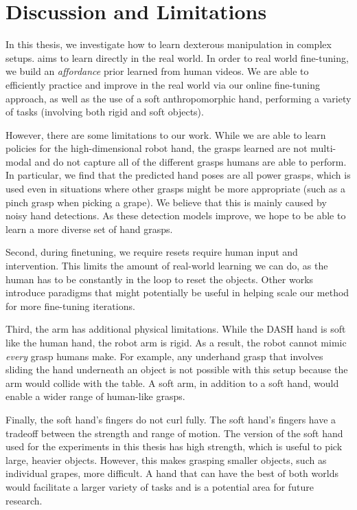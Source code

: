 \chapter{Discussion and Limitations}
\label{sec:discussion}

In this thesis, we investigate how to learn dexterous manipulation in complex setups. \ours aims to learn directly in the real world. In order to real world fine-tuning, we build an \textit{affordance} prior learned from human videos. We are able to efficiently practice and improve in the real world via our online fine-tuning approach, as well as the use of a soft anthropomorphic hand, performing a variety of tasks (involving both rigid and soft objects).

However, there are some limitations to our work.  While we are able to learn policies for the high-dimensional robot hand, the grasps learned are not multi-modal and do not capture all of the different grasps humans are able to perform.  In particular, we find that the predicted hand poses are all power grasps, which is used even in situations where other grasps might be more appropriate (such as a pinch grasp when picking a grape). We believe that this is mainly caused by noisy hand detections. As these detection models improve, we hope to be able to learn a more diverse set of hand grasps. 

Second, during finetuning, we require resets require human input and intervention. This limits the amount of real-world learning we can do, as the human has to be constantly in the loop to reset the objects. Other works \cite{chen2022single, guptaYuZhaoKumar2021reset} introduce paradigms that might potentially be useful in helping scale our method for more fine-tuning iterations.

Third, the arm has additional physical limitations. While the DASH hand is soft like the human hand, the robot arm is rigid. As a result, the robot cannot mimic \textit{every} grasp humans make. For example, any underhand grasp that involves sliding the hand underneath an object is not possible with this setup because the arm would collide with the table. A soft arm, in addition to a soft hand, would enable a wider range of human-like grasps.

Finally, the soft hand's fingers do not curl fully. The soft hand's fingers have a tradeoff between the strength and range of motion. The version of the soft hand used for the experiments in this thesis has high strength, which is useful to pick large, heavier objects. However, this makes grasping smaller objects, such as individual grapes, more difficult. A hand that can have the best of both worlds would facilitate a larger variety of tasks and is a potential area for future research.